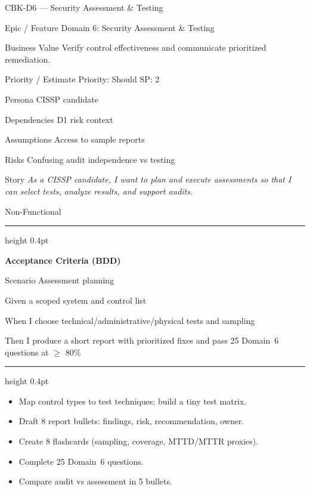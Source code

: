 \documentclass[11pt,a4paper]{article}
\providecommand{\square}{\fbox{\rule{0pt}{0.85ex}\rule{0.85ex}{0pt}}}%
\newcommand{\citem}{\item[$\square$]}
\newcommand{\Tag}[1]{\tcbox[on line, colback=PillBack, colframe=PillBack,
  coltext=PillText, boxrule=0pt, arc=2mm, left=2pt, right=2pt, top=1pt, bottom=1pt]{\small #1}}
\newcommand{\ThinRule}{\par\vspace{4pt}\hrule height 0.4pt\par\vspace{4pt}}
\begin{document}
\clearpage
\begin{StoryCardBox}{CBK-D6 --- Security Assessment \& Testing}
\begin{metadesc}
\item[Epic / Feature] Domain 6: Security Assessment \& Testing
\item[Business Value] Verify control effectiveness and communicate prioritized remediation.
\item[Priority / Estimate] Priority: Should \quad SP: 2
\item[Persona] CISSP candidate
\item[Dependencies] D1 risk context
\item[Assumptions] Access to sample reports
\item[Risks] Confusing audit independence vs testing
\item[Story] \textit{As a CISSP candidate, I want to plan and execute assessments so that I can select tests, analyze results, and support audits.}
\item[Non-Functional] \Tag{Security} \Tag{Reliability}
\end{metadesc}

\ThinRule
\textbf{Acceptance Criteria (BDD)}
\begin{metadesc}
\item[Scenario] Assessment planning
\item[Given] a scoped system and control list
\item[When] I choose technical/administrative/physical tests and sampling
\item[Then] I produce a short report with prioritized fixes and pass 25 Domain~6 questions at $\geq$ 80\%
\end{metadesc}

\ThinRule
\begin{TasksBox}
\begin{itemize}
  \citem Map control types to test techniques; build a tiny test matrix.
  \citem Draft 8 report bullets: findings, risk, recommendation, owner.
  \citem Create 8 flashcards (sampling, coverage, MTTD/MTTR proxies).
  \citem Complete 25 Domain~6 questions.
  \citem Compare audit vs assessment in 5 bullets.
\end{itemize}
\end{TasksBox}
\end{StoryCardBox}
\end{document}
